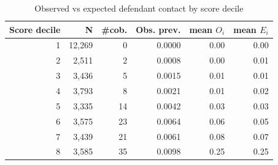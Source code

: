 \begin{table}[htbp]\centering
\caption{Observed vs expected defendant contact by score decile}
\label{tab:obs_exp_bins}
\begin{tabular}{rrrrrr}\hline
Score decile & N & \#cob. & Obs. prev. & mean $O_i$ & mean $E_i$ \\\hline
1 & 12,269 & 0 & 0.0000 & 0.00 & 0.00 \\
2 &  2,511 & 2 & 0.0008 & 0.00 & 0.01 \\
3 &  3,436 & 5 & 0.0015 & 0.01 & 0.01 \\
4 &  3,793 & 8 & 0.0021 & 0.01 & 0.02 \\
5 &  3,335 & 14 & 0.0042 & 0.03 & 0.03 \\
6 &  3,575 & 23 & 0.0064 & 0.06 & 0.05 \\
7 &  3,439 & 21 & 0.0061 & 0.08 & 0.07 \\
8 &  3,585 & 35 & 0.0098 & 0.25 & 0.25 \\
\hline\end{tabular}\end{table}
